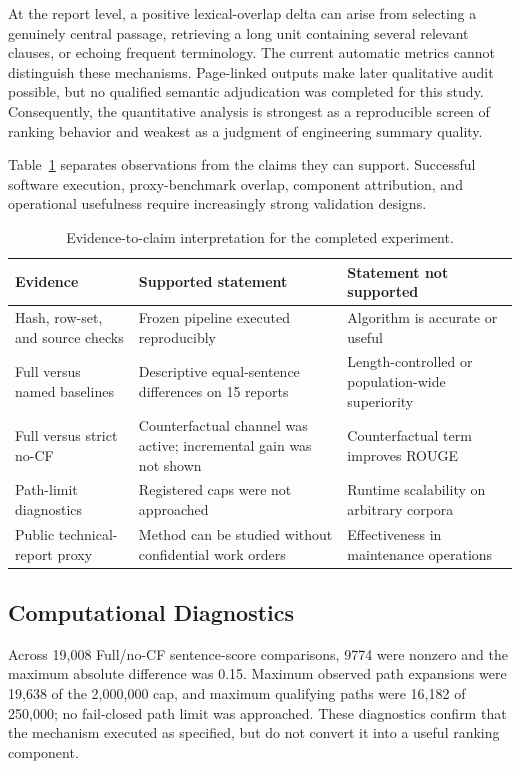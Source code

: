 \documentclass[applsci,article,submit,moreauthors]{Definitions/mdpi}
\begin{document}
At the report level, a positive lexical-overlap delta can arise from selecting a genuinely central passage, retrieving a long unit containing several relevant clauses, or echoing frequent terminology. The current automatic metrics cannot distinguish these mechanisms. Page-linked outputs make later qualitative audit possible, but no qualified semantic adjudication was completed for this study. Consequently, the quantitative analysis is strongest as a reproducible screen of ranking behavior and weakest as a judgment of engineering summary quality.

Table~\ref{tab:evidence-matrix} separates observations from the claims they can support. Successful software execution, proxy-benchmark overlap, component attribution, and operational usefulness require increasingly strong validation designs.

\begin{table}[H]
\caption{Evidence-to-claim interpretation for the completed experiment.}
\label{tab:evidence-matrix}\centering\small
\begin{tabular}{p{}p{}p{}}
\toprule
Evidence & Supported statement & Statement not supported\\
\midrule
Hash, row-set, and source checks & Frozen pipeline executed reproducibly & Algorithm is accurate or useful\\
Full versus named baselines & Descriptive equal-sentence differences on 15 reports & Length-controlled or population-wide superiority\\
Full versus strict no-CF & Counterfactual channel was active; incremental gain was not shown & Counterfactual term improves ROUGE\\
Path-limit diagnostics & Registered caps were not approached & Runtime scalability on arbitrary corpora\\
Public technical-report proxy & Method can be studied without confidential work orders & Effectiveness in maintenance operations\\
\bottomrule
\end{tabular}
\end{table}

\subsection{Computational Diagnostics}

Across 19,008 Full/no-CF sentence-score comparisons, 9774 were nonzero and the maximum absolute difference was 0.15. Maximum observed path expansions were 19,638 of the 2,000,000 cap, and maximum qualifying paths were 16,182 of 250,000; no fail-closed path limit was approached. These diagnostics confirm that the mechanism executed as specified, but do not convert it into a useful ranking component.
\end{document}
